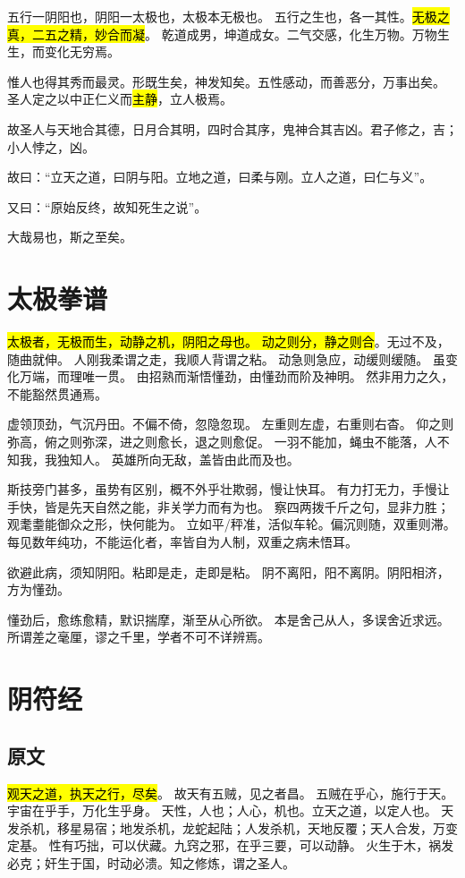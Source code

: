 五行一阴阳也，阴阳一太极也，太极本无极也。
五行之生也，各一其性。\hl{无极之真，二五之精，妙合而凝}。
乾道成男，坤道成女。二气交感，化生万物。万物生生，而变化无穷焉。

惟人也得其秀而最灵。形既生矣，神发知矣。五性感动，而善恶分，万事出矣。
圣人定之以中正仁义而\hl{主静}，立人极焉。

故圣人与天地合其德，日月合其明，四时合其序，鬼神合其吉凶。君子修之，吉；小人悖之，凶。

故曰：“立天之道，曰阴与阳。立地之道，曰柔与刚。立人之道，曰仁与义”。

又曰：“原始反终，故知死生之说”。

大哉易也，斯之至矣。

\section{太极拳谱}

\hl{太极者，无极而生，动静之机，阴阳之母也。
动之则分，静之则合}。无过不及，随曲就伸。
人刚我柔谓之走，我顺人背谓之粘。
动急则急应，动缓则缓随。
虽变化万端，而理唯一贯。
由招熟而渐悟懂劲，由懂劲而阶及神明。
然非用力之久，不能豁然贯通焉。

虚领顶劲，气沉丹田。不偏不倚，忽隐忽现。
左重则左虚，右重则右杳。
仰之则弥高，俯之则弥深，进之则愈长，退之则愈促。
一羽不能加，蝇虫不能落，人不知我，我独知人。
英雄所向无敌，盖皆由此而及也。

斯技旁门甚多，虽势有区别，概不外乎壮欺弱，慢让快耳。
有力打无力，手慢让手快，皆是先天自然之能，非关学力而有为也。
察四两拨千斤之句，显非力胜；观耄耋能御众之形，快何能为。
立如平/秤准，活似车轮。偏沉则随，双重则滞。
每见数年纯功，不能运化者，率皆自为人制，双重之病未悟耳。

欲避此病，须知阴阳。粘即是走，走即是粘。
阴不离阳，阳不离阴。阴阳相济，方为懂劲。

懂劲后，愈练愈精，默识揣摩，渐至从心所欲。
本是舍己从人，多误舍近求远。
所谓差之毫厘，谬之千里，学者不可不详辨焉。

\section{阴符经}

\subsection{原文}

\hl{观天之道，执天之行，尽矣}。
故天有五贼，见之者昌。
五贼在乎心，施行于天。宇宙在乎手，万化生乎身。
天性，人也；人心，机也。立天之道，以定人也。
天发杀机，移星易宿；地发杀机，龙蛇起陆；人发杀机，天地反覆；天人合发，万变定基。
性有巧拙，可以伏藏。九窍之邪，在乎三要，可以动静。
火生于木，祸发必克；奸生于国，时动必溃。知之修炼，谓之圣人。

